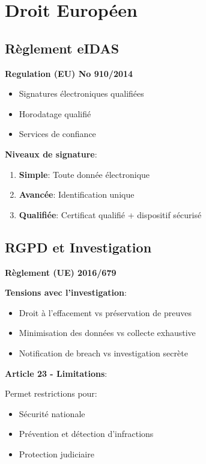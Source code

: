 \section{Droit Européen}
\subsection{Règlement eIDAS}
\textbf{Regulation (EU) No 910/2014}

\begin{itemize}
\item Signatures électroniques qualifiées
\item Horodatage qualifié
\item Services de confiance
\end{itemize}

\textbf{Niveaux de signature}:

\begin{enumerate}
\item \textbf{Simple}: Toute donnée électronique
\item \textbf{Avancée}: Identification unique
\item \textbf{Qualifiée}: Certificat qualifié + dispositif sécurisé
\end{enumerate}

\subsection{RGPD et Investigation}
\textbf{Règlement (UE) 2016/679}

\textbf{Tensions avec l'investigation}:

\begin{itemize}
\item Droit à l'effacement vs préservation de preuves
\item Minimisation des données vs collecte exhaustive
\item Notification de breach vs investigation secrète
\end{itemize}

\textbf{Article 23 - Limitations}:

Permet restrictions pour:

\begin{itemize}
\item Sécurité nationale
\item Prévention et détection d'infractions
\item Protection judiciaire
\end{itemize}

